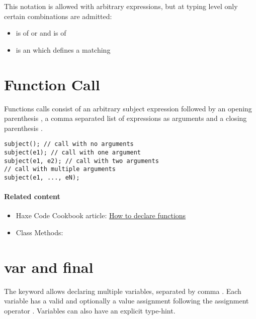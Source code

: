 This notation is allowed with arbitrary expressions, but at typing level only certain combinations are admitted:

\begin{itemize}
	\item {} is of  or  and  is of 
	\item {} is an  which defines a matching 
\end{itemize}


\section{Function Call}
\label{expression-function-call}

Functions calls consist of an arbitrary subject expression followed by an opening parenthesis \expr{(}, a comma \expr{,} separated list of expressions as arguments and a closing parenthesis \expr{)}.

\begin{lstlisting}
subject(); // call with no arguments
subject(e1); // call with one argument
subject(e1, e2); // call with two arguments
// call with multiple arguments
subject(e1, ..., eN);
\end{lstlisting}


\paragraph{Related content}
\begin{itemize}
	\item Haxe Code Cookbook article: \href{http://code.haxe.org/category/beginner/declare-functions.html}{How to declare functions}
	\item Class Methods: 
\end{itemize}


\section{var and final}
\label{expression-var}

The  keyword allows declaring multiple variables, separated by comma \expr{,}. Each variable has a valid  and optionally a value assignment following the assignment operator \expr{=}. Variables can also have an explicit type-hint.

